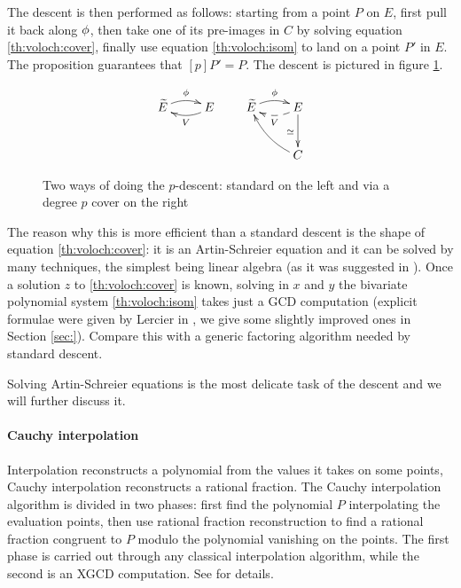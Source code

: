 The descent is then performed as follows: starting from a point $P$ on
$E$, first pull it back along $\phi$, then take one of its
pre-images in $C$ by solving equation \eqref{th:voloch:cover}, finally
use equation \eqref{th:voloch:isom} to land on a point $P'$ in $E$.
The proposition guarantees that $[p]P' = P$. The descent is pictured
in figure \ref{fig:voloch}.

\begin{figure}
  \centering
  \[
  \xymatrix{\widetilde{E}\ar@/^/[r]^{\frobisog} & E\ar@/^/[l]^{V}}
  \qquad
  \xymatrix{
    \widetilde{E}\ar@/^/[r]^{\frobisog} & E\ar@/^/@{-->}[l]^{V}\ar[d]_{\simeq}\\
    & C\ar@/^/[ul]
  }
  \]
  
  \caption{Two ways of doing the $p$-descent: standard on the left and via a degree $p$ cover on the right}
  \label{fig:voloch}
\end{figure}


The reason why this is more efficient than a standard descent is the
shape of equation \eqref{th:voloch:cover}: it is an Artin-Schreier
equation and it can be solved by many techniques, the simplest being
linear algebra (as it was suggested in \cite{Cou96}). Once a solution
$z$ to \eqref{th:voloch:cover} is known, solving in $x$ and $y$ the
bivariate polynomial system \eqref{th:voloch:isom} takes just a GCD
computation (explicit formulae were given by Lercier in
\cite[$\S$6.2]{Ler97}, we give some slightly improved ones in Section
\ref{sec:}). Compare this with a generic factoring algorithm needed by
standard descent.

Solving Artin-Schreier equations is the most delicate task of the
descent and we will further discuss it.


\paragraph{Cauchy interpolation}
Interpolation reconstructs a polynomial from the values it takes on
some points, Cauchy interpolation reconstructs a rational
fraction. The Cauchy interpolation algorithm is divided in two phases:
first find the polynomial $P$ interpolating the evaluation points,
then use rational fraction reconstruction to find a rational fraction
congruent to $P$ modulo the polynomial vanishing on the points. The
first phase is carried out through any classical interpolation
algorithm, while the second is an XGCD computation. See
\cite[$\S$5.8]{vzGG} for details.

